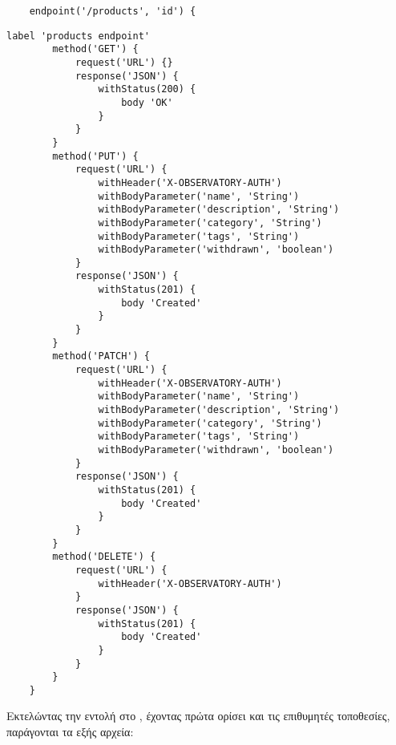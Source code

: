     \begin{lstlisting}
    endpoint('/products', 'id') {
    \end{lstlisting}
    \begin{lstlisting}[deletekeywords={endpoint,description}]
        label 'products endpoint'
        method('GET') {
            request('URL') {}
            response('JSON') {
                withStatus(200) {
                    body 'OK'
                }
            }
        }
        method('PUT') {
            request('URL') {
                withHeader('X-OBSERVATORY-AUTH')
                withBodyParameter('name', 'String')
                withBodyParameter('description', 'String')
                withBodyParameter('category', 'String')
                withBodyParameter('tags', 'String')
                withBodyParameter('withdrawn', 'boolean')
            }
            response('JSON') {
                withStatus(201) {
                    body 'Created'
                }
            }
        }
        method('PATCH') {
            request('URL') {
                withHeader('X-OBSERVATORY-AUTH')
                withBodyParameter('name', 'String')
                withBodyParameter('description', 'String')
                withBodyParameter('category', 'String')
                withBodyParameter('tags', 'String')
                withBodyParameter('withdrawn', 'boolean')
            }
            response('JSON') {
                withStatus(201) {
                    body 'Created'
                }
            }
        }
        method('DELETE') {
            request('URL') {
                withHeader('X-OBSERVATORY-AUTH')
            }
            response('JSON') {
                withStatus(201) {
                    body 'Created'
                }
            }
        }
    }
    \end{lstlisting}

    Εκτελώντας την εντολή \emph{} στο ,
    έχοντας πρώτα ορίσει και τις επιθυμητές τοποθεσίες,
    παράγονται τα εξής αρχεία:
    
